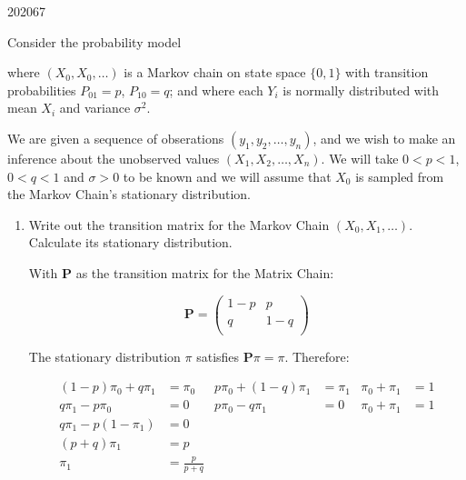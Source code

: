 \documentclass[10pt,\jkfside,a4paper]{article}
\begin{document}
\begin{examquestion}{2020}{6}{7}

Consider the probability model

\begin{center}
\end{center}

where $(X_0, X_0, \dots)$ is a Markov chain on state space $\{0, 1\}$ with
transition probabilities $P_{01} = p$, $P_{10} = q$; and where each $Y_i$ is
normally distributed with mean $X_i$ and variance $\sigma^2$.

We are given a sequence of obserations $(y_1, y_2, \dots, y_n)$, and we wish
to make an inference about the unobserved values $(X_1, X_2, \dots, X_n)$.
We will take $0 < p < 1$, $0 < q < 1$ and $\sigma > 0$ to be known and we
will assume that $X_0$ is sampled from the Markov Chain's stationary
distribution.

\begin{enumerate}[label=(\alph*)]

\item Write out the transition matrix for the Markov Chain $(X_0, X_1,
\dots)$. Calculate its stationary distribution.

With $\mathbf{P}$ as the transition matrix for the Matrix Chain:

\[
\mathbf{P} =
\begin{pmatrix}
1 - p & p \\
q & 1 - q \\
\end{pmatrix}
\]

The stationary distribution $\pi$ satisfies $\mathbf{P}\pi = \pi$. Therefore:

\begin{align*}
(1 - p)\pi_0 + q\pi_1 &= \pi_0 & p\pi_0 + (1 - q)\pi_1 &= \pi_1 & \pi_0 +
\pi_1 &= 1 \\
q\pi_1 - p\pi_0 &= 0 & p\pi_0 - q\pi_1 &= 0 & \pi_0 + \pi_1 &= 1 \\
q\pi_1 - p(1 - \pi_1) &= 0 \\
(p + q)\pi_1 &= p \\
\pi_1 &= \frac{p}{p + q} \\
\end{align*}


\end{enumerate}
\end{examquestion}
\end{document}
